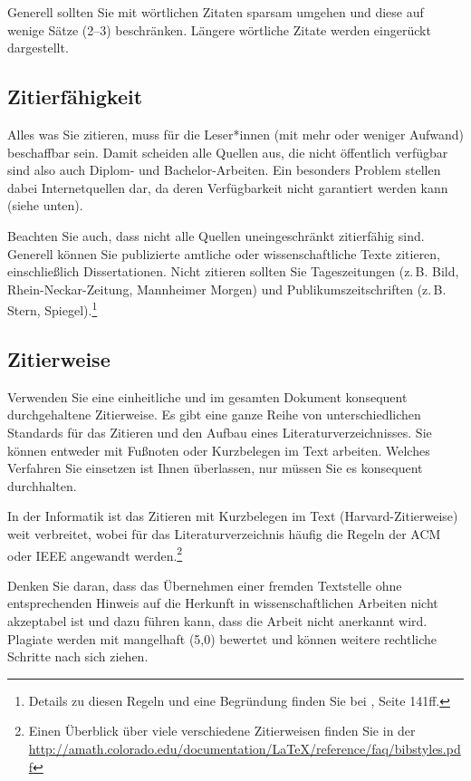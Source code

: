 \documentclass[a4paper,11pt,headings=normal]{scrartcl}
\begin{document}
Generell sollten Sie mit wörtlichen Zitaten sparsam umgehen und diese auf wenige Sätze (2--3) beschränken. Längere wörtliche Zitate werden eingerückt dargestellt.

\subsection{Zitierfähigkeit}
Alles was Sie zitieren, muss für die Leser*innen (mit mehr oder weniger Aufwand) beschaffbar sein. Damit scheiden alle Quellen aus, die nicht öffentlich verfügbar sind also auch Diplom- und Bachelor-Arbeiten. Ein besonders Problem stellen dabei Internetquellen dar, da deren Verfügbarkeit nicht garantiert werden kann (siehe unten).

Beachten Sie auch, dass nicht alle Quellen uneingeschränkt zitierfähig sind. Generell können Sie publizierte amtliche oder wissenschaftliche Texte zitieren, einschließlich Dissertationen. Nicht zitieren sollten Sie Tageszeitungen (z.\,B. Bild, Rhein-Neckar-Zeitung, Mannheimer Morgen) und Publikumszeitschriften (z.\,B. Stern, Spiegel).\footnote{Details zu diesen Regeln und eine Begründung finden Sie bei \autocite{Kramer2009}, Seite 141ff.}

\subsection{Zitierweise}
Verwenden Sie eine einheitliche und im gesamten Dokument konsequent durchgehaltene Zitierweise. Es gibt eine ganze Reihe von unterschiedlichen Standards für das Zitieren und den Aufbau eines Literaturverzeichnisses. Sie können entweder mit Fußnoten oder Kurzbelegen im Text arbeiten. Welches Verfahren Sie einsetzen ist Ihnen überlassen, nur müssen Sie es konsequent durchhalten.

In der Informatik ist das Zitieren mit Kurzbelegen im Text (Harvard-Zitierweise) weit verbreitet, wobei für das Literaturverzeichnis häufig die Regeln der \acs{ACM} oder \acs{IEEE} angewandt werden.\footnote{Einen Überblick über viele verschiedene Zitierweisen finden Sie in der \url{http://amath.colorado.edu/documentation/LaTeX/reference/faq/bibstyles.pdf}}

Denken Sie daran, dass das Übernehmen einer fremden Textstelle ohne entsprechenden Hinweis auf die Herkunft in wissenschaftlichen Arbeiten nicht akzeptabel ist und dazu führen kann, dass die Arbeit nicht anerkannt wird. Plagiate werden mit mangelhaft (5,0) bewertet und können weitere rechtliche Schritte nach sich ziehen.
\end{document}

